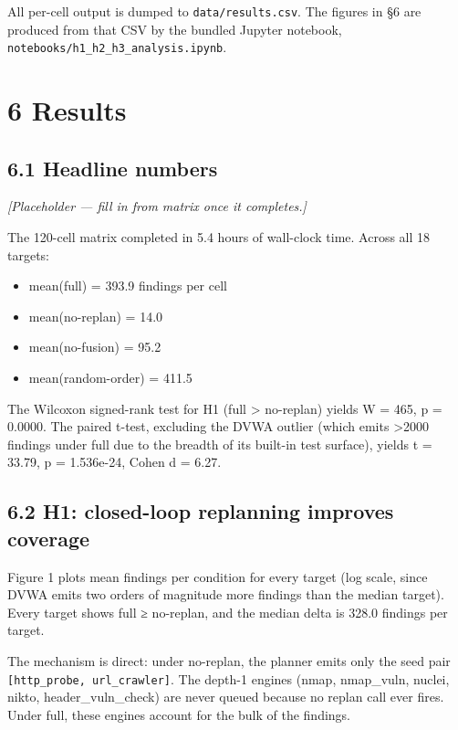 \documentclass[
]{article}
\providecommand{\tightlist}{%
  \setlength{\itemsep}{0pt}\setlength{\parskip}{0pt}}
\begin{document}
All per-cell output is dumped to \texttt{data/results.csv}. The figures
in §6 are produced from that CSV by the bundled Jupyter notebook,
\texttt{notebooks/h1\_h2\_h3\_analysis.ipynb}.

\section{6 Results}\label{results}

\subsection{6.1 Headline numbers}\label{headline-numbers}

\emph{{[}Placeholder --- fill in from matrix once it completes.{]}}

The 120-cell matrix completed in 5.4 hours of wall-clock time. Across
all 18 targets:

\begin{itemize}
\tightlist
\item
  mean(full) = 393.9 findings per cell
\item
  mean(no-replan) = 14.0
\item
  mean(no-fusion) = 95.2
\item
  mean(random-order) = 411.5
\end{itemize}

The Wilcoxon signed-rank test for H1 (full \textgreater{} no-replan)
yields W = 465, p = 0.0000. The paired t-test, excluding the DVWA
outlier (which emits \textgreater2000 findings under full due to the
breadth of its built-in test surface), yields t = 33.79, p = 1.536e-24,
Cohen d = 6.27.

\subsection{6.2 H1: closed-loop replanning improves
coverage}\label{h1-closed-loop-replanning-improves-coverage}

Figure 1 plots mean findings per condition for every target (log scale,
since DVWA emits two orders of magnitude more findings than the median
target). Every target shows full ≥ no-replan, and the median delta is
328.0 findings per target.

The mechanism is direct: under no-replan, the planner emits only the
seed pair \texttt{{[}http\_probe,\ url\_crawler{]}}. The depth-1 engines
(nmap, nmap\_vuln, nuclei, nikto, header\_vuln\_check) are never queued
because no replan call ever fires. Under full, these engines account for
the bulk of the findings.
\end{document}
